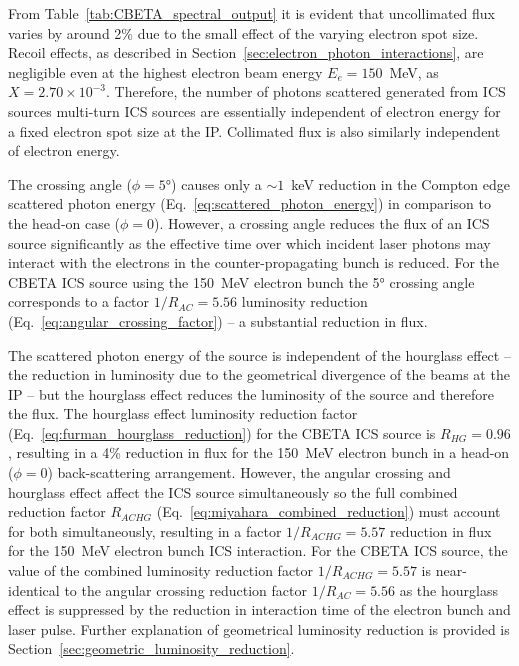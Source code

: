 \documentclass[../main.tex]{subfiles}
\begin{document}
From Table~\ref{tab:CBETA_spectral_output} it is evident that uncollimated flux varies by around 2\% due to the small effect of the varying electron spot size. Recoil effects, as described in Section~\ref{sec:electron_photon_interactions}, are negligible even at the highest electron beam energy $E_{e} = 150$~\si{\mega\electronvolt}, as $X = 2.70\times 10^{-3}$. Therefore, the number of photons scattered generated from ICS sources multi-turn ICS sources are essentially independent of electron energy for a fixed electron spot size at the IP. Collimated flux is also similarly independent of electron energy. 

The crossing angle ($\phi=5$\si{\degree}) causes only a $\sim 1$~\si{\kilo\electronvolt} reduction in the Compton edge scattered photon energy (Eq.~\ref{eq:scattered_photon_energy}) in comparison to the head-on case ($\phi = 0$). However, a crossing angle reduces the flux of an ICS source significantly as the effective time over which incident laser photons may interact with the electrons in the counter-propagating bunch is reduced. For the CBETA ICS source using the 150~\si{\mega\electronvolt} electron bunch the 5\si{\degree} crossing angle corresponds to a factor $1/R_{AC} = 5.56$ luminosity reduction (Eq.~\ref{eq:angular_crossing_factor}) -- a substantial reduction in flux. 

The scattered photon energy of the source is independent of the hourglass effect -- the reduction in luminosity due to the geometrical divergence of the beams at the IP \cite{furman1991hourglass} -- but the hourglass effect reduces the luminosity of the source and therefore the flux. The hourglass effect luminosity reduction factor (Eq.~\ref{eq:furman_hourglass_reduction}) for the CBETA ICS source is $R_{HG} = 0.96$, resulting in a 4\% reduction in flux for the 150~\si{\mega\electronvolt} electron bunch in a head-on ($\phi=0$) back-scattering arrangement. However, the angular crossing and hourglass effect affect the ICS source simultaneously so the full combined reduction factor $R_{ACHG}$ (Eq.~\ref{eq:miyahara_combined_reduction}) must account for both simultaneously, resulting in a factor $1/R_{ACHG} = 5.57$ reduction in flux for the 150~\si{\mega\electronvolt} electron bunch ICS interaction. For the CBETA ICS source, the value of the combined luminosity reduction factor $1/R_{ACHG} = 5.57$ is near-identical to the angular crossing reduction factor $1/R_{AC} = 5.56$ as the hourglass effect is suppressed by the reduction in interaction time of the electron bunch and laser pulse. Further explanation of geometrical luminosity reduction is provided is Section~\ref{sec:geometric_luminosity_reduction}.
\end{document}
